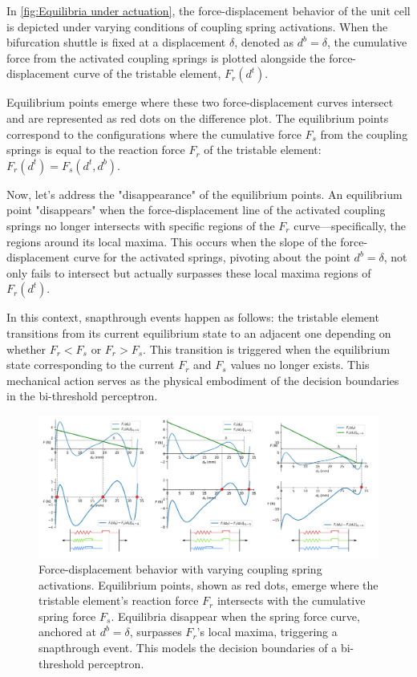 In \autoref*{fig:Equilibria under actuation}, the force-displacement behavior of the unit cell is depicted under varying conditions of coupling spring activations. When the bifurcation shuttle is fixed at a displacement \( \delta \), denoted as \( d^b = \delta \), the cumulative force from the activated coupling springs is plotted alongside the force-displacement curve of the tristable element, \( F_r(d^t) \).

Equilibrium points emerge where these two force-displacement curves intersect and are represented as red dots on the difference plot. The equilibrium points correspond to the configurations where the cumulative force \( F_s \) from the coupling springs is equal to the reaction force \( F_r \) of the tristable element: \( F_r(d^t) = F_s(d^t, d^b) \).

Now, let's address the "disappearance" of the equilibrium points. An equilibrium point "disappears" when the force-displacement line of the activated coupling springs no longer intersects with specific regions of the \( F_r \) curve—specifically, the regions around its local maxima. This occurs when the slope of the force-displacement curve for the activated springs, pivoting about the point \( d^b = \delta \), not only fails to intersect but actually surpasses these local maxima regions of \( F_r(d^t) \).

In this context, snapthrough events happen as follows: the tristable element transitions from its current equilibrium state to an adjacent one depending on whether \( F_r < F_s \) or \( F_r > F_s \). This transition is triggered when the equilibrium state corresponding to the current \( F_r \) and \( F_s \) values no longer exists. This mechanical action serves as the physical embodiment of the decision boundaries in the bi-threshold perceptron.


\begin{figure}[H]
    \centering
    \includegraphics[width=\textwidth]{images/SVGs/Equilibria2.pdf}
    \caption{Force-displacement behavior with varying coupling spring activations. Equilibrium points, shown as red dots, emerge where the tristable element's reaction force \( F_r \) intersects with the cumulative spring force \( F_s \). Equilibria disappear when the spring force curve, anchored at \( d^b = \delta \), surpasses \( F_r \)'s local maxima, triggering a snapthrough event. This models the decision boundaries of a bi-threshold perceptron.}
    \label{fig:Equilibria under actuation}
\end{figure}

